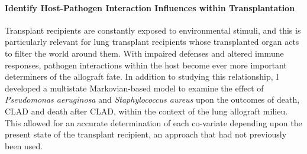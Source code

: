\documentclass[11pt]{nih-blank}%
\numberwithin{equation}{subsection}
\numberwithin{figure}{subsection}
\numberwithin{table}{subsection}
\begin{document}
\paragraph{Identify Host-Pathogen Interaction Influences within Transplantation}
Transplant recipients are constantly exposed to environmental stimuli, and this is particularly relevant for lung transplant recipients whose transplanted organ acts to filter the world around them. 
With impaired defenses and altered immune responses, pathogen interactions within the host become ever more important determiners of the allograft fate. 
In addition to studying this relationship, I developed a multistate Markovian-based model to examine the effect of \textit{Pseudomonas aeruginosa} and \textit{Staphylococcus aureus} upon the outcomes of death, CLAD and death after CLAD, within the context of the lung allograft milieu. 
This allowed for an accurate determination of each co-variate depending upon the present state of the transplant recipient, an approach that had not previously been used. 
\vspace{-10mm}
\renewcommand{\refname}{\normalsize{}\label{gregsonbs}}
\end{document}
